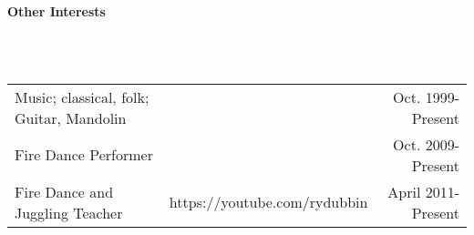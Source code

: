 \documentclass[a4paper,11pt]{article}
\newcommand{\lsep}{-0.2cm}
\newcommand{\resheading}[1]{{\small \colorbox{mygrey}{\begin{minipage}{0.975\textwidth}{\textbf{#1 \vphantom{p\^{E}}}}\end{minipage}}}}
\begin{document}

\resheading{\textbf{Other Interests} }\\[\lsep]
\\[0.2cm]
\indent \begin{tabular}{  l  r   r } 
\indent Music; classical, folk; Guitar, Mandolin & \indent  & \indent \indent Oct. 1999-Present\\
\indent Fire Dance Performer & \indent  & \indent \indent Oct. 2009-Present\\
\indent Fire Dance and Juggling Teacher & \indent https://youtube.com/rydubbin  & \indent  \indent April 2011-Present\\
\end{tabular}



\end{document}
